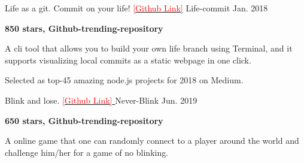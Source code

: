 

\begin{cventries}

  \cventry
    {Life as a git. Commit on your life! \href{https://github.com/ByronHsu/life-commit}{\textcolor{red}{[Github Link]}}} %
    {Life-commit} %
    {} %
    {Jan. 2018} %
    {
      \begin{cvitems} %
        \item {\textbf{850 stars, Github-trending-repository} }
        \item {A cli tool that allows you to build your own life branch using Terminal, and it supports visualizing local commits as a static webpage in one click.}
        \item {Selected as top-45 amazing node.js projects for 2018 on Medium.}
      \end{cvitems}
    }


  \cventry
    {Blink and lose. \href{https://github.com/ByronHsu/Never-Blink}{ \textcolor{red}{[Github Link]} }} %
    {Never-Blink} %
    {} %
    {Jun. 2019} %
    {
      \begin{cvitems} %
        \item {\textbf{650 stars, Github-trending-repository}}
        \item {A online game that one can randomly connect to a player around the world and challenge him/her for a game of no blinking.}      \end{cvitems}
    }

\end{cventries}
